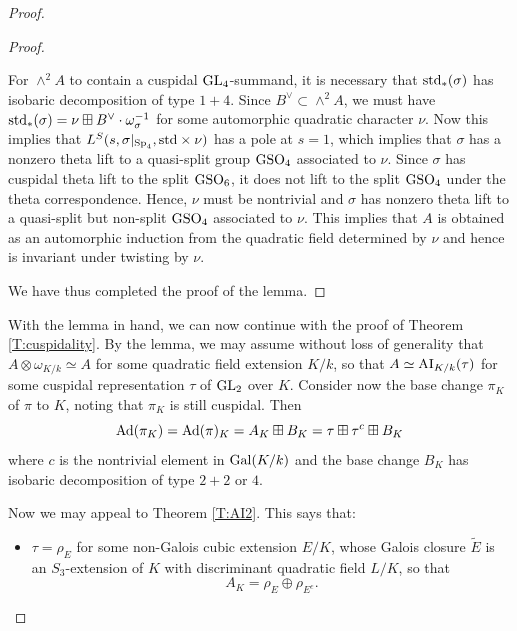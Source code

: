 \documentclass[11pt]{amsart}
\theoremstyle{plain}
\numberwithin{equation}{section}
\newcommand{\C}{\mathbb C}
\def\GSp{{\rm GSp}}
\def\PGSO{{\rm PGSO}}
\def\Sp{{\rm Sp}}
\def\GL{{\rm GL}}
\def\PGL{{\rm PGL}}
\def\GSO{{\rm GSO}}
\def\SO{{\rm SO}}
\def\Sp{{\rm Sp}}
\def\C{{\bf C}}
\def\C{{\mathbb C}}
\begin{document}
\begin{proof}
\begin{proof}
\begin{itemize}
For $\wedge^2A$ to contain a cuspidal $\GL_4$-summand,  it is necessary that ${\rm std}_*(\sigma)$ has isobaric decomposition of type $1 +4$. Since $B^{\vee} \subset \wedge^2 A$, we must have 
${\rm std}_*(\sigma) = \nu \boxplus B^{\vee} \cdot\omega_{\sigma}^{-1}$ for some automorphic quadratic character $\nu$.  
Now this implies that $L^S(s, \sigma|_{\Sp_4}, {\rm std} \times \nu)$ has a pole at $s=1$, which implies that $\sigma$ has a nonzero theta lift to a quasi-split group $\GSO_4$ associated to $\nu$. 
 Since $\sigma$ has cuspidal theta lift to the split $\GSO_6$, it does not lift to the split $\GSO_4$ under the theta correspondence. Hence, $\nu$ must be nontrivial and $\sigma$ has nonzero theta lift to a quasi-split but non-split $\GSO_4$ associated to  $\nu$. This implies that $A$ is obtained as an automorphic induction from the quadratic field determined by $\nu$ and hence is invariant under twisting by $\nu$. 



\end{itemize}
\vskip 5pt

We have thus completed the proof of the lemma.

\end{proof}
\vskip 5pt

With the lemma in hand, we can now continue with the proof of  Theorem \ref{T:cuspidality}. By the lemma, we may assume without loss of generality that $A \otimes \omega_{K/k} \simeq A$ for some quadratic field extension $K/k$,
so that $A \simeq {\rm AI}_{K/k}(\tau)$ for some cuspidal representation $\tau$ of $\GL_2$ over $K$.  
Consider now the base change $\pi_K$ of $\pi$ to $K$, noting that $\pi_K$ is still cuspidal.  Then
\[  {\rm Ad}(\pi_K) = {\rm Ad}(\pi)_K  = A_K  \boxplus B_K = \tau \boxplus  \tau^c \boxplus B_K \]
where $c$ is the nontrivial element in ${\rm Gal}(K/k)$ and the base change $B_K$ has isobaric decomposition of type $2+2$ or $4$. 
\vskip 5pt


Now we may appeal to Theorem \ref{T:AI2}.  This says that:
\vskip 5pt
\begin{itemize}
\item $\tau = \rho_E$ for some non-Galois cubic extension $E/K$, whose Galois closure $\tilde{E}$ is an $S_3$-extension of $K$ with discriminant quadratic field $L/K$, so that 
\[  A_K = \rho_E \oplus \rho_{E^c}. \] 


\end{itemize}
\end{proof}
\end{document}

